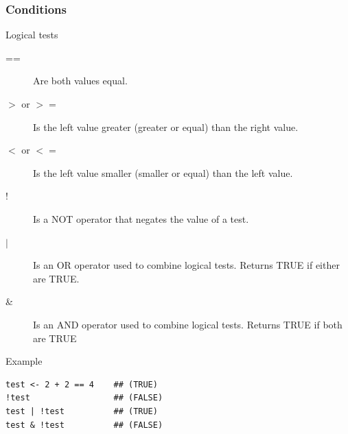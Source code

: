 \documentclass[10pt]{beamer}
\newenvironment{xframe}[2][]
  {\begin{frame}[fragile,environment=xframe,#1]
  \frametitle{#2}}
  {\end{frame}}
\begin{document}
\begin{xframe}{Conditions}
  \begin{block}{Logical tests}
	
    \begin{description}
    \item[{\sf ==}] Are both values equal.
    \item[{\sf $>$ or $>=$}] Is the left value greater (greater or equal)
    than the right value.
	\item[{\sf $<$ or $<=$}] Is the left value smaller (smaller or equal) than
	the left value.
    \item[!] Is a NOT operator that negates the value of a test.
    \item[$|$] Is an OR operator used to combine logical tests. Returns TRUE if
    either are TRUE.
    \item[\&] Is an AND operator used to combine logical tests. Returns TRUE
    if both are TRUE
    \end{description}
  \end{block}
  \begin{exampleblock}{Example}
\begin{verbatim}
test <- 2 + 2 == 4    ## (TRUE)
!test                 ## (FALSE)
test | !test          ## (TRUE)
test & !test          ## (FALSE)
\end{verbatim}  
  \end{exampleblock}
\end{xframe}

\end{document}
